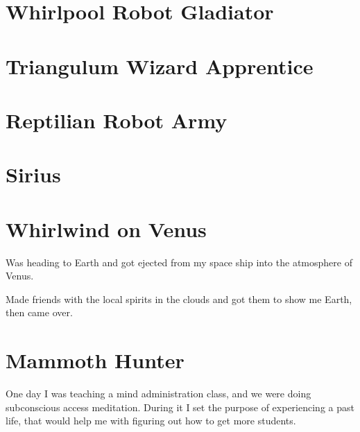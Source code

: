 \chapter{Whirlpool Robot Gladiator}
\chapter{Triangulum Wizard Apprentice}
\chapter{Reptilian Robot Army}
\chapter{Sirius}
% 
% 
% 
% 
% 
\chapter{Whirlwind on Venus}
Was heading to Earth and got ejected from my space ship into the atmosphere of
Venus.

Made friends with the local spirits in the clouds and got them to show me Earth,
then came over. 

\chapter{Mammoth Hunter}\label{reincarnation:mammoth}
One day I was teaching a mind administration class, and we were doing 
subconscious access meditation. During it I set the purpose of experiencing a
past life, that would help me with figuring out how to get more students.

